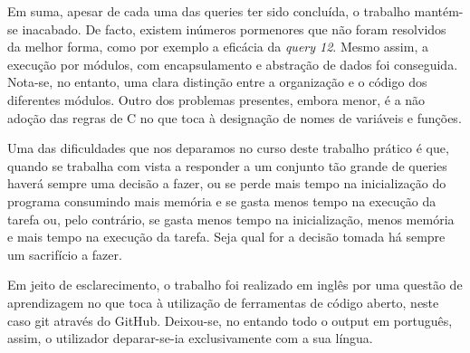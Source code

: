 \documentclass[10pt] {article}
\begin{document}
\indent\par Em suma, apesar de cada uma das queries ter sido concluída, o trabalho mantém-se inacabado. De
facto, existem inúmeros pormenores que não foram resolvidos da melhor forma, como por exemplo a
eficácia da \emph{query 12}. Mesmo assim, a execução por módulos, com encapsulamento e abstração de dados
foi conseguida. Nota-se, no entanto, uma clara distinção entre a organização e o código dos diferentes módulos.
Outro dos problemas presentes, embora menor, é a não adoção das regras de C no que toca à designação de
nomes de variáveis e funções.
\par Uma das dificuldades que nos deparamos no curso deste trabalho prático é que, quando se trabalha com vista a responder a um conjunto tão grande de queries
haverá sempre uma decisão a fazer, ou se perde mais tempo na inicialização do programa consumindo mais memória e se gasta
menos tempo na execução da tarefa ou, pelo contrário, se gasta menos tempo na inicialização, menos memória e mais tempo na
execução da tarefa. Seja qual for a decisão tomada há sempre um sacrifício a fazer.
\par Em jeito de esclarecimento, o trabalho foi realizado em inglês por uma questão de aprendizagem no que toca à
utilização de ferramentas de código aberto, neste caso git através do GitHub. Deixou-se, no entando todo o output em português, assim, o utilizador
deparar-se-ia exclusivamente com a sua língua.
\end{document}
